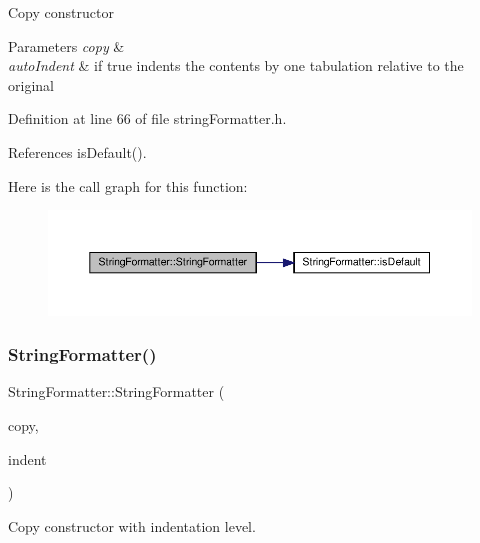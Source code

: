 Copy constructor


\begin{DoxyParams}{Parameters}
{\em copy} & \\
\hline
{\em auto\+Indent} & if true indents the contents by one tabulation relative to the original \\
\hline
\end{DoxyParams}


Definition at line 66 of file string\+Formatter.\+h.



References is\+Default().

Here is the call graph for this function\+:
\nopagebreak
\begin{figure}[H]
\begin{center}
\leavevmode
\includegraphics[width=350pt]{classStringFormatter_a5ad14c57a78febf7f120fb867cb25680_cgraph}
\end{center}
\end{figure}
\mbox{\label{classStringFormatter_ae74e7245e1e8564eb3b4f98dc6ed228f}} 
\subsubsection{\texorpdfstring{String\+Formatter()}{StringFormatter()}\hspace{0.1cm}{\footnotesize\ttfamily [3/3]}}
{\footnotesize\ttfamily String\+Formatter\+::\+String\+Formatter (\begin{DoxyParamCaption}\item[{const \hyperlink{classStringFormatter}{String\+Formatter} \&}]{copy,  }\item[{const int}]{indent }\end{DoxyParamCaption})\hspace{0.3cm}{\ttfamily [inline]}}



Copy constructor with indentation level. 

